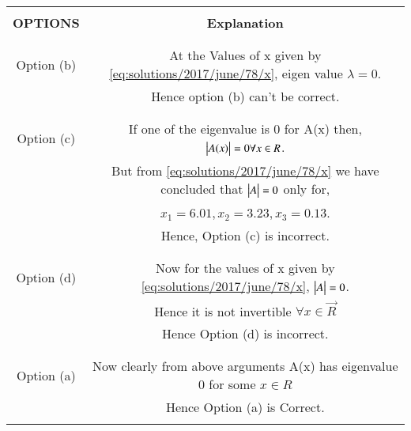 \begin{table*}[h!]
\begin{center}
\resizebox{\columnwidth}{!}
{
\begin{tabular}{|c|c|}
\hline
& \\
\textbf{OPTIONS} & \textbf{Explanation}\\
&\\
\hline
& \\
Option (b) & At the Values of x given by \eqref{eq:solutions/2017/june/78/x}, eigen value $\lambda = 0$. \\ &
Hence option (b) can't be correct.\\
&\\
\hline
& \\
Option (c) & If one of the eigenvalue is 0 for A(x) then, $\begin{vmatrix}A(x)\end{vmatrix} = 0 \forall x \in R$.\\ & 
But from \eqref{eq:solutions/2017/june/78/x} we have concluded that $\begin{vmatrix}A\end{vmatrix} = 0$ only for, 
\\& $x_1 = 6.01, x_2 = 3.23, x_3 = 0.13$.\\ &
Hence, Option (c) is incorrect.\\
& \\
\hline
& \\
Option (d) & Now for the values of x given by \eqref{eq:solutions/2017/june/78/x}, $\begin{vmatrix}A\end{vmatrix} = 0$. \\ &
Hence it is not invertible $\forall x\in \vec{R}$ \\&
Hence Option (d) is incorrect. \\ 
& \\
\hline
& \\
Option (a) & Now clearly from above arguments A(x) has eigenvalue 0 for some $x \in R$  \\&
Hence Option (a) is Correct. \\ 
& \\
\hline

\end{tabular}
}
\end{center}
\caption{}
\label{table:solutions/2017/june/78/}
\end{table*}
\begin{comment}
In other words at these values of x, eigenvalue $\lambda = 0$. Hence option (b) is eliminated. Now for these values of x, $\mydet{A} = 0$. Hence it is not invertible $\forall x\in \vec{R} \implies$ option (d) is eliminated. Now, if one of the eigenvalue is 0 for A(x), then $\mydet{A(x)} = 0 \forall x\in \vec{R}$. But from equation \eqref{eq:solutions/2017/june/78/x} we have concluded that $\mydet{A} = 0$ only for $x_1 = 6.01, x_2 = 3.23, x_3 = 0.13$. hence, option (b) is also eliminated. Hence the correct option is (a).
\end{comment} 
